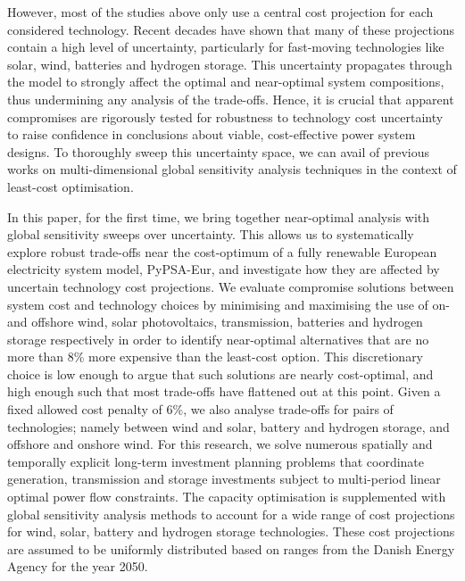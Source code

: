 However, most of the studies above only use a central cost projection for each
considered technology. Recent decades have shown that many of these
projections contain a high level of uncertainty, particularly for fast-moving
technologies like solar, wind, batteries and hydrogen storage.
\cite{ludererImpactDeclining2021,victoriaSolarPhotovoltaics2021,jaxa-rozenSourcesUncertainty2021} This
uncertainty propagates through the model to strongly affect the optimal and
near-optimal system compositions, thus undermining any analysis of the
trade-offs. Hence, it is crucial that apparent compromises are rigorously tested
for robustness to technology cost uncertainty to raise confidence in conclusions
about viable, cost-effective power system designs. To thoroughly sweep this
uncertainty space, we can avail of previous works on
multi-dimensional global sensitivity analysis techniques in the context of
least-cost optimisation.\cite{trondle_trade-offs_2020,
mavromatidis_uncertainty_2018, pizarro-alonso_uncertainties_2019,
fais_impact_2016, usher_value_2015}


In this paper, for the first time, we bring together near-optimal analysis with
global sensitivity sweeps over uncertainty. This allows us to systematically
explore robust trade-offs near the cost-optimum of a fully renewable European
electricity system model, PyPSA-Eur,\cite{pypsaeur} and investigate how they are
affected by uncertain technology cost projections. We evaluate compromise
solutions between system cost and technology choices by minimising and
maximising the use of on- and offshore wind, solar photovoltaics, transmission,
batteries and hydrogen storage respectively in order to identify near-optimal
alternatives that are no more than 8\% more expensive than the least-cost
option. This discretionary choice is low enough to argue that such solutions are
nearly cost-optimal, and high enough such that most trade-offs have flattened
out at this point. Given a fixed allowed cost penalty of 6\%, we also analyse
trade-offs for pairs of technologies; namely between wind and solar, battery and
hydrogen storage, and offshore and onshore wind. For this research, we solve
numerous spatially and temporally explicit long-term investment planning
problems that coordinate generation, transmission and storage investments
subject to multi-period linear optimal power flow constraints. The capacity
optimisation is supplemented with global sensitivity analysis methods to account
for a wide range of cost projections for wind, solar, battery and hydrogen
storage technologies. These cost projections are assumed to be uniformly
distributed based on ranges from the Danish Energy Agency for the year
2050.\cite{DEA}

